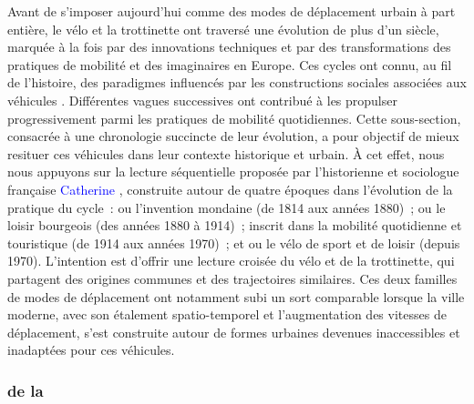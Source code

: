 \begin{refsegment}
Avant de s’imposer aujourd’hui comme des modes de déplacement urbain à part entière, le vélo et la trottinette ont traversé une évolution de plus d’un siècle, marquée à la fois par des innovations techniques et par des transformations des pratiques de mobilité et des imaginaires en Europe. Ces cycles ont connu, au fil de l’histoire, des paradigmes influencés par les constructions sociales associées aux véhicules \textcolor{blue}{\autocite[13]{heran_retour_2015}}. Différentes vagues successives ont contribué à les propulser progressivement parmi les pratiques de mobilité quotidiennes. Cette sous-section, consacrée à une chronologie succincte de leur évolution, a pour objectif de mieux resituer ces véhicules dans leur contexte historique et urbain. À cet effet, nous nous appuyons sur la lecture séquentielle proposée par l'historienne et sociologue française \textcolor{blue}{Catherine} \textcolor{blue}{\textcite[]{bertho-lavenir_voyages_2011}}, construite autour de quatre époques dans l'évolution de la pratique du cycle~:  ou l'invention mondaine (de 1814 aux années 1880)~;  ou le loisir bourgeois (des années 1880 à 1914)~;  inscrit dans la mobilité quotidienne et touristique (de 1914 aux années 1970)~; et  ou le vélo de sport et de loisir (depuis 1970). L’intention est d’offrir une lecture croisée du vélo et de la trottinette, qui partagent des origines communes et des trajectoires similaires. Ces deux familles de modes de déplacement ont notamment subi un sort comparable lorsque la ville moderne, avec son étalement spatio-temporel et l’augmentation des vitesses de déplacement, s’est construite autour de formes urbaines devenues inaccessibles et inadaptées pour ces véhicules.%

\subsubsection*{ de la 
    \label{chap1:proximite-velo-trottinette-chronologie}
    }


\end{refsegment}

